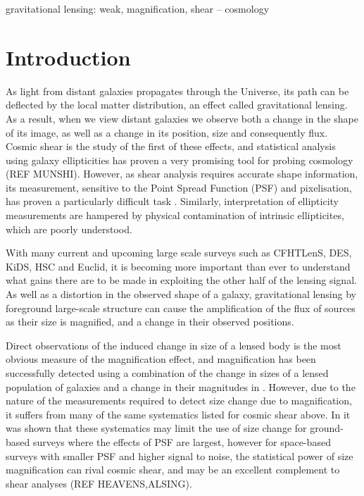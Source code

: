 \documentclass[useAMS,usenatbib,times,letter,amssymb]{mn2e}
\begin{document}
\begin{keywords}
gravitational lensing: weak, magnification, shear -- cosmology
\end{keywords}

\section{Introduction}

As light from distant galaxies propagates through the Universe,  its path can be deflected by the local matter distribution, an effect called gravitational lensing. As a result, when we view distant galaxies we observe both a change in the shape of its image, as well as a change in its position, size and consequently flux. Cosmic shear is the study of the first of these effects, and statistical analysis using galaxy ellipticities has proven a very promising tool for probing cosmology \cite[reviewed in ][]{Bartelmann:2001p431} (REF MUNSHI). However, as shear analysis requires accurate shape information, its measurement, sensitive to the Point Spread Function (PSF) and pixelisation, has proven a particularly difficult task \citep{Bridle:2009p1030, Kitching:2012p2018}. Similarly, interpretation of ellipticity measurements are hampered by physical contamination of intrinsic ellipticites, which are poorly understood. %

With many current and upcoming large scale surveys such as CFHTLenS, DES, KiDS, HSC and Euclid, it is becoming more important than ever to understand what gains there are to be made in exploiting the other half of the lensing signal. As well as a distortion in the observed shape of a galaxy, gravitational lensing by foreground large-scale structure can cause the amplification of the flux of sources as their size is magnified, and a change in their observed positions. 

Direct observations of the induced change in size of a lensed body is the most obvious measure of the magnification effect, and magnification has been successfully detected using a combination of the change in sizes of a lensed population of galaxies and a change in their magnitudes in \cite{Schmidt:2012p1106}. However, due to the nature of the measurements required to detect size change due to magnification, it suffers from many of the same systematics listed for cosmic shear above. In \cite{Casaponsa:2013p1480} it was shown that these systematics may limit the use of size change for ground-based surveys where the effects of PSF are largest, however for space-based surveys with smaller PSF and higher signal to noise, the statistical power of size magnification can rival cosmic shear, and may be an excellent complement to shear analyses (REF HEAVENS,ALSING).
\end{document}
